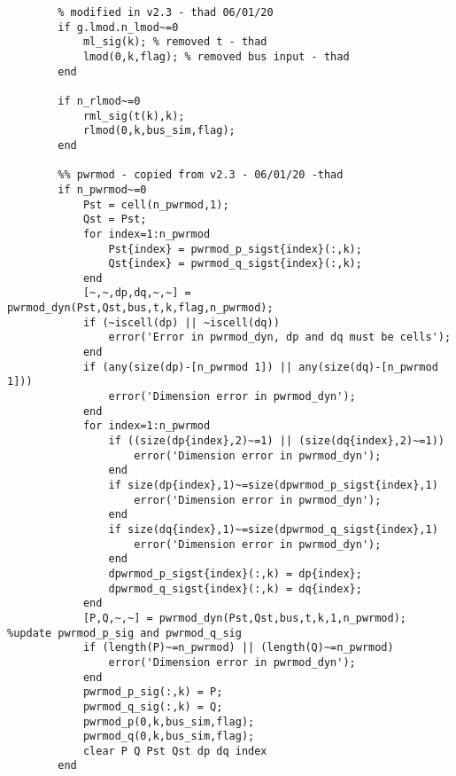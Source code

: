 \documentclass[12pt]{article}
\begin{document}
\begin{verbatim}
        % modified in v2.3 - thad 06/01/20
        if g.lmod.n_lmod~=0
            ml_sig(k); % removed t - thad
            lmod(0,k,flag); % removed bus input - thad
        end
        
        if n_rlmod~=0
            rml_sig(t(k),k);
            rlmod(0,k,bus_sim,flag);
        end
        
        %% pwrmod - copied from v2.3 - 06/01/20 -thad
        if n_pwrmod~=0
            Pst = cell(n_pwrmod,1);
            Qst = Pst;
            for index=1:n_pwrmod
                Pst{index} = pwrmod_p_sigst{index}(:,k);
                Qst{index} = pwrmod_q_sigst{index}(:,k);
            end
            [~,~,dp,dq,~,~] = pwrmod_dyn(Pst,Qst,bus,t,k,flag,n_pwrmod);
            if (~iscell(dp) || ~iscell(dq)) 
                error('Error in pwrmod_dyn, dp and dq must be cells'); 
            end
            if (any(size(dp)-[n_pwrmod 1]) || any(size(dq)-[n_pwrmod 1]))
                error('Dimension error in pwrmod_dyn'); 
            end
            for index=1:n_pwrmod
                if ((size(dp{index},2)~=1) || (size(dq{index},2)~=1))
                    error('Dimension error in pwrmod_dyn'); 
                end
                if size(dp{index},1)~=size(dpwrmod_p_sigst{index},1)
                    error('Dimension error in pwrmod_dyn'); 
                end
                if size(dq{index},1)~=size(dpwrmod_q_sigst{index},1)
                    error('Dimension error in pwrmod_dyn'); 
                end
                dpwrmod_p_sigst{index}(:,k) = dp{index};
                dpwrmod_q_sigst{index}(:,k) = dq{index};
            end
            [P,Q,~,~] = pwrmod_dyn(Pst,Qst,bus,t,k,1,n_pwrmod); %update pwrmod_p_sig and pwrmod_q_sig
            if (length(P)~=n_pwrmod) || (length(Q)~=n_pwrmod)
                error('Dimension error in pwrmod_dyn'); 
            end
            pwrmod_p_sig(:,k) = P;
            pwrmod_q_sig(:,k) = Q;
            pwrmod_p(0,k,bus_sim,flag);
            pwrmod_q(0,k,bus_sim,flag);
            clear P Q Pst Qst dp dq index
        end
        

\end{verbatim}
\end{document}
